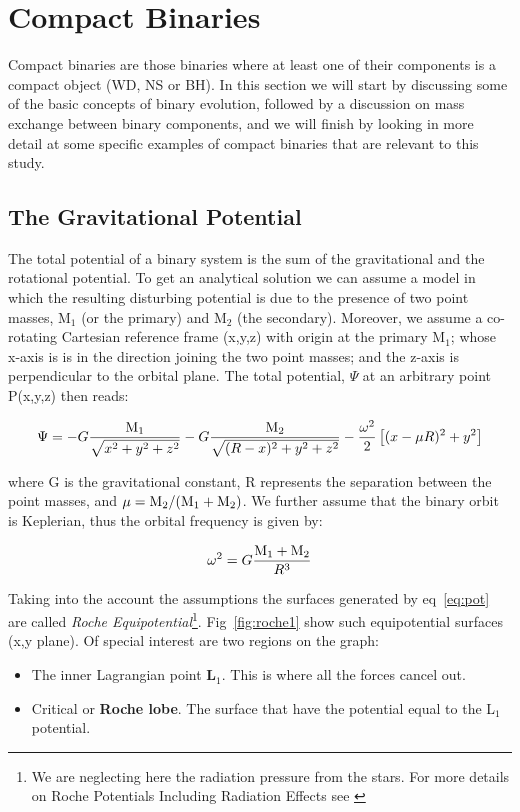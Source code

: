 \section[Compact Binaries]{Compact Binaries}\label{sec:cb}

Compact binaries are those binaries where at least one of their components is a compact object (WD, NS or BH). In this section we will start by discussing some of the basic concepts of binary evolution, followed by a discussion on mass exchange between binary components,  and we will finish by looking in more detail at some specific examples of compact binaries that are relevant to this study.   


\subsection{The Gravitational Potential}

The total potential of a binary system is the sum of the gravitational and the rotational potential. To get an analytical solution we can assume a model in which the resulting disturbing potential is due to the presence of two point masses, M$_1$ (or the primary) and M$_2$ (the secondary). Moreover, we assume a co-rotating Cartesian reference frame (x,y,z) with origin at the primary M$_1$; whose x-axis is is in the direction joining the two point masses; and the z-axis is perpendicular to the orbital plane. The total potential, $\Psi$ at an arbitrary point P(x,y,z) then reads:

\begin{equation}
        \Psi = - G \frac{\text M _1}{\sqrt{x^2+y^2+z^2}} - G \frac{\text M _2 }{\sqrt{(R - x)^2 + y^2 + z^2}} - \frac{\omega^2 }{2}  \left [ (x- \mu R )^2  + y^2 \right ]    
        \label{eq:pot}
\end{equation}

where G is the gravitational constant, R represents the separation between the point masses, and $\mu = \text M _2/(\text M _1 + \text M _2)$. We further assume that the binary orbit is Keplerian, thus the orbital frequency is given by:

\begin{equation}
        \omega ^2 = G \frac{\text M _1 + \text M _2}{R^3}
        \label{eq:roche}
\end{equation}

Taking into the account the assumptions the surfaces generated by eq~\ref{eq:pot} are called \emph{Roche Equipotential}\footnote{We are neglecting here the radiation pressure from the stars. For more details on Roche Potentials Including Radiation Effects see \cite{schuerman_roche_1972}}. Fig~\ref{fig:roche1} show such equipotential surfaces (x,y plane). Of special interest are two regions on the graph:
\begin{itemize}
        \item The inner Lagrangian point \textbf{L$_1$}. This is where all the forces cancel out. 
        \item Critical or \textbf{Roche lobe}. The surface that have the potential equal to the L$_1$ potential. 
\end{itemize}

